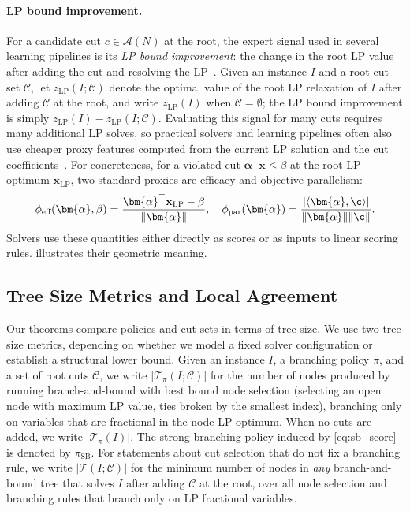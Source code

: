 \documentclass[smallextended,envcountsect]{svjour3} %
\let\ACCc\c
\newcommand{\x}{\mathbf{x}}
\renewcommand{\c}{\mathbf{c}}
\newcommand{\Acal}{\mathcal{A}}
\newcommand{\Tcal}{\mathcal{T}}
\newcommand{\Ccal}{\mathcal{C}}
\newcommand{\0}{\mathbf{0}}
\newcommand{\LP}{\mathrm{LP}}
\newcommand{\1}{\mathbf{1}} %
\let\c\ACCc
\begin{document}
\paragraph{LP bound improvement.}
For a candidate cut $c\in\Acal(N)$ at the root, the expert signal used in several learning pipelines is its \emph{LP bound improvement}: the change in the root LP value after adding the cut and resolving the LP~\citep{coniglio2015boundImprovement,Paulus2022,puigdemont2024learning}. Given an instance $I$ and a root cut set $\Ccal$, let $z_{\LP}(I;\Ccal)$ denote the optimal value of the root LP relaxation of $I$ after adding $\Ccal$ at the root, and write $z_{\LP}(I)$ when $\Ccal=\emptyset$; the LP bound improvement is simply  $z_{\LP}(I) - z_{\LP}(I;\Ccal)$. Evaluating this signal for many cuts requires many additional LP solves, so practical solvers and learning pipelines often also use cheaper proxy features computed from the current LP solution and the cut coefficients~\citep{achterberg2009scip,wesselmann2012implementing}.
For concreteness, for a violated cut $\bm{\alpha}^\top \x \le \beta$ at the root LP optimum $\x_{\LP}$, two standard proxies are efficacy and objective parallelism:
\[
  \phi_{\text{eff}}(\bm{\alpha}, \beta) = \frac{\bm{\alpha}^\top \x_{\LP}-\beta}{\|\bm{\alpha}\|},
  \quad
  \phi_{\text{par}}(\bm{\alpha}) = \frac{|\langle \bm{\alpha}, \c \rangle|}{\|\bm{\alpha}\| \|\c\|}.
\]
Solvers use these quantities either directly as scores or as inputs to linear scoring rules.
 illustrates their geometric meaning.

\subsection{Tree Size Metrics and Local Agreement}

Our theorems compare policies and cut sets in terms of tree size.
We use two tree size metrics, depending on whether we model a fixed solver configuration or establish a structural lower bound.
Given an instance $I$, a branching policy $\pi$, and a set of root cuts $\Ccal$, we write $|\Tcal_{\pi}(I;\Ccal)|$ for the number of nodes produced by running branch-and-bound with best bound node selection (selecting an open node with maximum LP value, ties broken by the smallest index), branching only on variables that are fractional in the node LP optimum.
When no cuts are added, we write $|\Tcal_{\pi}(I)|$.
The strong branching policy induced by \eqref{eq:sb_score} is denoted by $\pi_{\mathrm{SB}}$.
For statements about cut selection that do not fix a branching rule, we write $|\Tcal(I;\Ccal)|$ for the minimum number of nodes in {\em any} branch-and-bound tree that solves $I$ after adding $\Ccal$ at the root, over all node selection and branching rules that branch only on LP fractional variables.
\end{document}
